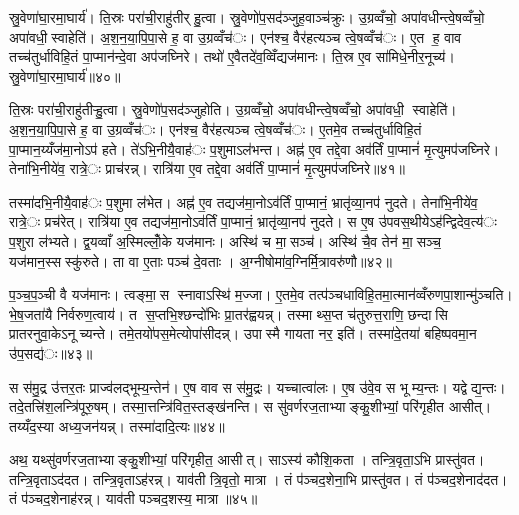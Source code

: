 स्रु॒वेणा॑घा॒रमा॒घार्य॑। ति॒स्रः परा॑ची॒राहु॑तीर् हु॒त्वा। स्रु॒वेणो॑प॒सद॑ञ्जुह॒वाञ्च॑क्रुः। उ॒ग्रव्वँचो॒ अपा॑वधीन्त्वे॒षव्वँचो॒ अपा॑वधी॒स्वाहेति॑। अ॒श॒न॒या॒पि॒पा॒से ह॒ वा उ॒ग्रव्वँच॑ः। एन॑श्च॒ वैर॑हत्यञ्च त्वे॒षव्वँच॑ः। ए॒त ह॒ वाव तच्च॑तुर्धाविहि॒तं पा॒प्मान॑न्दे॒वा अप॑जघ्निरे। तथो॑ ए॒वैतदे॑व॒व्विँद्यज॑मानः। ति॒स्र ए॒व सा॑मिधे॒नीर॒नूच्य॑। स्रु॒वेणा॑घा॒रमा॒घार्य॑॥४०॥

ति॒स्रः परा॑ची॒राहु॑तीऱ्हु॒त्वा। स्रु॒वेणो॑प॒सद॑ञ्जुहोति। उ॒ग्रव्वँचो॒ अपा॑वधीन्त्वे॒षव्वँचो॒ अपा॑वधी॒ स्वाहेति॑। अ॒श॒न॒या॒पि॒पा॒से ह॒ वा उ॒ग्रव्वँच॑ः। एन॑श्च॒ वैर॑हत्यञ्च त्वे॒षव्वँच॑ः। ए॒तमे॒व तच्च॑तुर्धाविहि॒तं पा॒प्मान॒य्यँज॑मा॒नोऽप॑ हते। ते॑ऽभि॒नीयै॒वाह॑ः प॒शुमाऽल॑भन्त। अह्न॑ ए॒व तद्दे॒वा अव॑र्तिं पा॒प्मानं॑ मृ॒त्युमप॑जघ्निरे। तेना॑भि॒नीये॑व॒ रात्रे॒ः प्राच॑रन्न्। रात्रि॑या ए॒व तद्दे॒वा अव॑र्तिं पा॒प्मानं॑ मृ॒त्युमप॑जघ्निरे॥४१॥

तस्मा॑दभि॒नीयै॒वाह॑ः प॒शुमा ल॑भेत। अह्न॑ ए॒व तद्यज॑मा॒नोऽव॑र्तिं पा॒प्मानं॒ भ्रातृ॑व्या॒नप॑ नुदते। तेना॑भि॒नीये॑व॒ रात्रे॒ः प्रच॑रेत्। रात्रि॑या ए॒व तद्यज॑मा॒नोऽव॑र्तिं पा॒प्मानं॒ भ्रातृ॑व्या॒नप॑ नुदते। स ए॒ष उ॑पवस॒थीयेऽह॑न्द्विदेव॒त्य॑ः प॒शुरा ल॑भ्यते। द्व॒यव्वाँ अ॒स्मिल्लोँ॒के यज॑मानः। अस्थि॑ च मा॒सञ्च॑। अस्थि॑ चै॒व तेन॑ मा॒सञ्च॒ यज॑मान॒स्सस्कु॑रुते। ता वा ए॒ताः पञ्च॑ दे॒वताः। अ॒ग्नीषोमा॑व॒ग्निर्मि॒त्रावरु॑णौ॥४२॥

प॒ञ्च॒प॒ञ्ची वै यज॑मानः। त्वङ्मा॒स स्नावाऽस्थि॑ म॒ज्जा। ए॒तमे॒व तत्प॑ञ्चधाविहि॒तमा॒त्मान॑व्वँरुणपा॒शान्मु॑ञ्चति। भे॒ष॒जता॑यै निर्वरुण॒त्वाय॑। त स॒प्तभि॒श्छन्दो॑भिः प्रा॒तर॑ह्वयन्न्। तस्माथ्स॒प्त च॑तुरुत्त॒राणि॒ छन्दासि प्रातरनुवा॒केऽनूच्यन्ते। तमे॒तयो॑पस॒मेत्योपा॑सीदन्न्। उपास्मै गायता नर॒ इति॑। तस्मा॑दे॒तया॑ बहिष्पवमा॒न उ॑प॒सद्य॑ः॥४३॥


स स॑मु॒द्र उ॑त्तर॒तः प्राज्व॑लद्भूम्य॒न्तेन॑। ए॒ष वाव स स॑मु॒द्रः। यच्चात्वा॑लः। ए॒ष उ॑वे॒व स भूम्य॒न्तः। यद्वेद्य॒न्तः। तदे॒तत्त्रि॑श॒लन्त्रि॑पूरु॒षम्। तस्मा॒त्तन्त्रि॑वित॒स्तङ्ख॑नन्ति। स सु॑वर्णरज॒ताभ्याङ्कु॒शीभ्यां॒ परि॑गृहीत आसीत्। तय्यँद॒स्या अध्य॒जन॑यन्न्। तस्मा॑दादि॒त्यः॥४४॥

अथ॒ यथ्सु॑वर्णरज॒ताभ्याङ्कु॒शीभ्यां॒ परि॑गृहीत॒ आसीत्। साऽस्य॑ कौशि॒कता। तन्त्रि॒वृता॒ऽभि प्रास्तु॑वत। तन्त्रि॒वृताऽद॑दत। तन्त्रि॒वृताऽह॑रन्न्। याव॑ती त्रि॒वृतो॒ मात्रा। तं प॑ञ्चद॒शेना॒भि प्रास्तु॑वत। तं प॑ञ्चद॒शेनाद॑दत। तं प॑ञ्चद॒शेनाह॑रन्न्। याव॑ती पञ्चद॒शस्य॒ मात्रा॥४५॥


